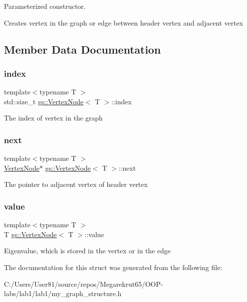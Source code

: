 Parameterized constructor. 

Creates vertex in the graph or edge between header vertex and adjacent vertex 

\subsection{Member Data Documentation}
\mbox{\label{structgs_1_1_vertex_node_a8dd82fa9a0b37a0194368dcd7752b04a}} 
\subsubsection{\texorpdfstring{index}{index}}
{\footnotesize\ttfamily template$<$typename T $>$ \\
std\+::size\+\_\+t \mbox{\hyperlink{structgs_1_1_vertex_node}{gs\+::\+Vertex\+Node}}$<$ T $>$\+::index}

The index of vertex in the graph \mbox{\label{structgs_1_1_vertex_node_a7fc257ce53eb77e180531b39bb303250}} 
\subsubsection{\texorpdfstring{next}{next}}
{\footnotesize\ttfamily template$<$typename T $>$ \\
\mbox{\hyperlink{structgs_1_1_vertex_node}{Vertex\+Node}}$\ast$ \mbox{\hyperlink{structgs_1_1_vertex_node}{gs\+::\+Vertex\+Node}}$<$ T $>$\+::next}

The pointer to adjacent vertex of header vertex \mbox{\label{structgs_1_1_vertex_node_a0bc246c7c0bfbea6354d90c704761fd3}} 
\subsubsection{\texorpdfstring{value}{value}}
{\footnotesize\ttfamily template$<$typename T $>$ \\
T \mbox{\hyperlink{structgs_1_1_vertex_node}{gs\+::\+Vertex\+Node}}$<$ T $>$\+::value}

Eigenvalue, which is stored in the vertex or in the edge 

The documentation for this struct was generated from the following file\+:\begin{DoxyCompactItemize}
\item 
C\+:/\+Users/\+User81/source/repos/\+Megarekrut65/\+O\+O\+P-\/labs/lab1/lab1/my\+\_\+graph\+\_\+structure.\+h\end{DoxyCompactItemize}
